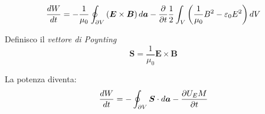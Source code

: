 \documentclass[a4paper]{scrarticle}
\begin{document}
\begin{equation*}
    \frac{dW}{dt} = -\frac{1}{\mu_0}\oint_{\partial V} \left(\bm E \times \bm B\right) d\bm a - \pdv{t}\frac{1}{2}\int_V \left(\frac{1}{\mu_0}B^2- \varepsilon_0 {E^2}\right) dV
\end{equation*}

Definisco il \emph{vettore di Poynting}
\begin{equation}
    \bm S = \frac{1}{\mu_0} \bm E \times \bm B
\end{equation}

La potenza diventa:
\begin{equation}
    \frac{dW}{dt}= - \oint_{\partial V} \bm S \cdot d \bm a - \pdv{U_EM}{t}
\end{equation}
\end{document}
